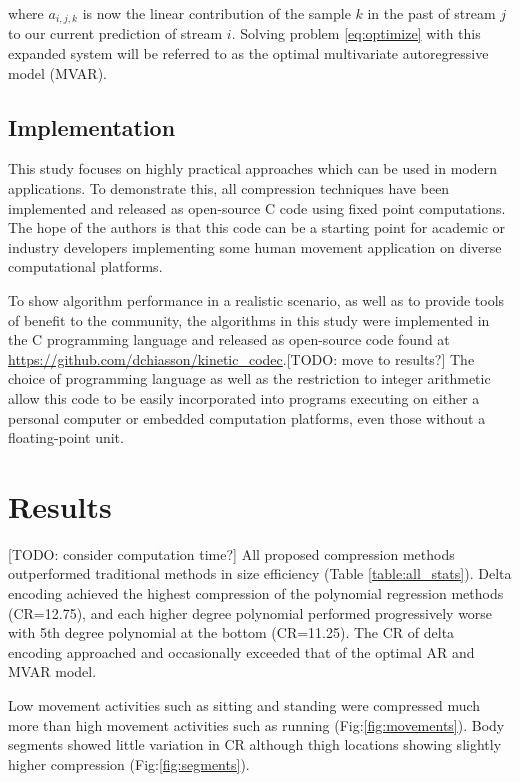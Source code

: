 \documentclass[journal]{IEEEtran}
\begin{document}
where $a_{i,j,k}$ is now the linear contribution of the sample $k$ in the past of stream $j$ to our current prediction of stream $i$. Solving problem \eqref{eq:optimize} with this expanded system will be referred to as the optimal multivariate autoregressive model (MVAR).

\subsection{Implementation}

This study focuses on highly practical approaches which can be used in modern applications. To demonstrate this, all compression techniques have been implemented and released as open-source C code using fixed point computations. The hope of the authors is that this code can be a starting point for academic or industry developers implementing some human movement application on diverse computational platforms.

To show algorithm performance in a realistic scenario, as well as to provide tools of benefit to the community, the algorithms in this study were implemented in the C programming language and released as open-source code found at \url{https://github.com/dchiasson/kinetic_codec}.[TODO: move to results?] The choice of programming language as well as the restriction to integer arithmetic allow this code to be easily incorporated into programs executing on either a personal computer or embedded computation platforms, even those without a floating-point unit.

\section{Results}
[TODO: consider computation time?]
All proposed compression methods outperformed traditional methods in size efficiency (Table \ref{table:all_stats}). Delta encoding achieved the highest compression of the polynomial regression methods (CR=12.75), and each higher degree polynomial performed progressively worse with 5th degree polynomial at the bottom (CR=11.25). The CR of delta encoding approached and occasionally exceeded that of the optimal AR and MVAR model.

Low movement activities such as sitting and standing were compressed much more than high movement activities such as running (Fig:\ref{fig:movements}). Body segments showed little variation in CR although thigh locations showing slightly higher compression (Fig:\ref{fig:segments}).
\end{document}
